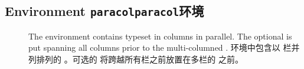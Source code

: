 \subsection{Environment \texttt{paracol}\hfill \texttt{paracol}环境}
\label{sec:ref-paracol}

\begin{description}%
\item[]\mbox{}\par
{}
\begin{paracol}{2}
The environment  contains  typeset in 
columns in parallel.  The optional  is put spanning all columns
prior to the multi-columned .
\switchcolumn
环境中包含以  栏并列排列的 。可选的  将跨越所有栏之前放置在多栏的  之前。
\end{paracol}


\end{description}
